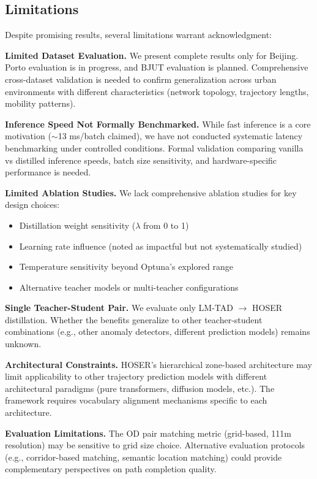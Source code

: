 \subsection{Limitations}
\label{sec:conclusion-limitations}

Despite promising results, several limitations warrant acknowledgment:

\textbf{Limited Dataset Evaluation.} We present complete results only for Beijing. Porto evaluation is in progress, and BJUT evaluation is planned. Comprehensive cross-dataset validation is needed to confirm generalization across urban environments with different characteristics (network topology, trajectory lengths, mobility patterns).

\textbf{Inference Speed Not Formally Benchmarked.} While fast inference is a core motivation ($\sim$13 ms/batch claimed), we have not conducted systematic latency benchmarking under controlled conditions. Formal validation comparing vanilla vs distilled inference speeds, batch size sensitivity, and hardware-specific performance is needed.

\textbf{Limited Ablation Studies.} We lack comprehensive ablation studies for key design choices:
\begin{itemize}[noitemsep,topsep=0pt]
\item Distillation weight sensitivity ($\lambda$ from 0 to 1)
\item Learning rate influence (noted as impactful but not systematically studied)
\item Temperature sensitivity beyond Optuna's explored range
\item Alternative teacher models or multi-teacher configurations
\end{itemize}

\textbf{Single Teacher-Student Pair.} We evaluate only LM-TAD $\rightarrow$ HOSER distillation. Whether the benefits generalize to other teacher-student combinations (e.g., other anomaly detectors, different prediction models) remains unknown.

\textbf{Architectural Constraints.} HOSER's hierarchical zone-based architecture may limit applicability to other trajectory prediction models with different architectural paradigms (pure transformers, diffusion models, etc.). The framework requires vocabulary alignment mechanisms specific to each architecture.

\textbf{Evaluation Limitations.} The OD pair matching metric (grid-based, 111m resolution) may be sensitive to grid size choice. Alternative evaluation protocols (e.g., corridor-based matching, semantic location matching) could provide complementary perspectives on path completion quality.

